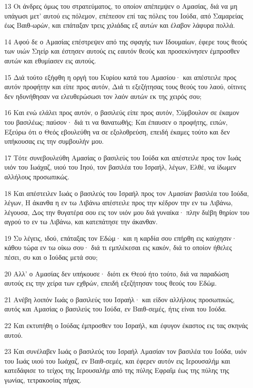 \par 13 Οι άνδρες όμως του στρατεύματος, το οποίον απέπεμψεν ο Αμασίας, διά να μη υπάγωσι μετ' αυτού εις πόλεμον, επέπεσον επί τας πόλεις του Ιούδα, από Σαμαρείας έως Βαιθ-ωρών, και επάταξαν τρεις χιλιάδας εξ αυτών και έλαβον λάφυρα πολλά.
\par 14 Αφού δε ο Αμασίας επέστρεψεν από της σφαγής των Ιδουμαίων, έφερε τους θεούς των υιών Σηείρ και έστησεν αυτούς εις εαυτόν θεούς και προσεκύνησεν έμπροσθεν αυτών και εθυμίασεν εις αυτούς.
\par 15 Διά τούτο εξήφθη η οργή του Κυρίου κατά του Αμασίου· και απέστειλε προς αυτόν προφήτην και είπε προς αυτόν, Διά τι εξεζήτησας τους θεούς του λαού, οίτινες δεν ηδυνήθησαν να ελευθερώσωσι τον λαόν αυτών εκ της χειρός σου;
\par 16 Και ενώ ελάλει προς αυτόν, ο βασιλεύς είπε προς αυτόν, Σύμβουλον σε έκαμον του βασιλέως; παύσον· διά τι να θανατωθής; Και έπαυσεν ο προφήτης, ειπών, Εξεύρω ότι ο Θεός εβουλεύθη να σε εξολοθρεύση, επειδή έκαμες τούτο και δεν υπήκουσας εις την συμβουλήν μου.
\par 17 Τότε συνεβουλεύθη Αμασίας ο βασιλεύς του Ιούδα και απέστειλε προς τον Ιωάς υιόν του Ιωάχαζ, υιού του Ιηού, τον βασιλέα του Ισραήλ, λέγων, Ελθέ, να ίδωμεν αλλήλους προσωπικώς.
\par 18 Και απέστειλεν Ιωάς ο βασιλεύς του Ισραήλ προς τον Αμασίαν βασιλέα του Ιούδα, λέγων, Η άκανθα η εν τω Λιβάνω απέστειλε προς την κέδρον την εν τω Λιβάνω, λέγουσα, Δος την θυγατέρα σου εις τον υιόν μου διά γυναίκα· πλην διέβη θηρίον του αγρού το εν τω Λιβάνω, και κατεπάτησε την άκανθαν.
\par 19 Συ λέγεις, ιδού, επάταξας τον Εδώμ· και η καρδία σου επήρθη εις καύχησιν· κάθου τώρα εν τω οίκω σου· διά τι εμπλέκεσαι εις κακόν, διά το οποίον ήθελες πέσει, συ και ο Ιούδας μετά σου;
\par 20 Αλλ' ο Αμασίας δεν υπήκουσε· διότι εκ Θεού ήτο τούτο, διά να παραδώση αυτούς εις την χείρα των εχθρών, επειδή εξεζήτησαν τους θεούς του Εδώμ.
\par 21 Ανέβη λοιπόν Ιωάς ο βασιλεύς του Ισραήλ· και είδον αλλήλους προσωπικώς, αυτός και Αμασίας ο βασιλεύς του Ιούδα, εν Βαιθ-σεμές, ήτις είναι του Ιούδα.
\par 22 Και εκτυπήθη ο Ιούδας έμπροσθεν του Ισραήλ, και έφυγον έκαστος εις τας σκηνάς αυτού.
\par 23 Και συνέλαβεν Ιωάς ο βασιλεύς του Ισραήλ Αμασίαν τον βασιλέα του Ιούδα, υιόν του Ιωάς υιού του Ιωάχαζ, εν Βαιθ-σεμές, και έφερεν αυτόν εις Ιερουσαλήμ και κατεδάφισε το τείχος της Ιερουσαλήμ από της πύλης Εφραΐμ έως της πύλης της γωνίας, τετρακοσίας πήχας.
